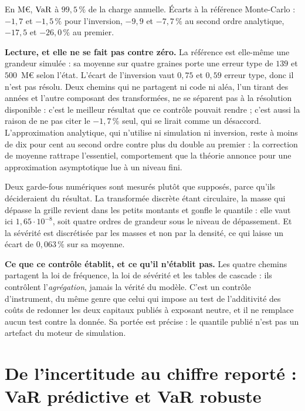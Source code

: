\vspace{4pt}
\noindent En M\euro, $\mathrm{VaR}$ à $99{,}5\,\%$ de la charge annuelle. Écarts à la référence
Monte-Carlo : $-1{,}7$ et $-1{,}5\,\%$ pour l'inversion, $-9{,}9$ et $-7{,}7\,\%$ au second ordre
analytique, $-17{,}5$ et $-26{,}0\,\%$ au premier.

\textbf{Lecture, et elle ne se fait pas contre zéro.} La référence est elle-même une grandeur
simulée : sa moyenne sur quatre graines porte une erreur type de $139$ et $500$~M\euro{} selon
l'état. L'écart de l'inversion vaut $0{,}75$ et $0{,}59$ erreur type, donc il n'est pas
résolu. Deux chemins qui ne partagent ni code ni aléa, l'un tirant des années et l'autre
composant des transformées, ne se séparent pas à la résolution disponible : c'est le meilleur
résultat que ce contrôle pouvait rendre ; c'est aussi la raison de ne pas citer le $-1{,}7\,\%$
seul, qui se lirait comme un désaccord. L'approximation analytique, qui n'utilise ni simulation
ni inversion, reste à moins de dix pour cent au second ordre contre plus du double au premier :
la correction de moyenne rattrape l'essentiel, comportement que la théorie annonce pour une
approximation asymptotique lue à un niveau fini.

Deux garde-fous numériques sont mesurés plutôt que supposés, parce qu'ils décideraient du
résultat. La transformée discrète étant circulaire, la masse qui dépasse la grille revient dans
les petits montants et gonfle le quantile : elle vaut ici $1{,}65\cdot 10^{-8}$, soit quatre ordres
de grandeur sous le niveau de dépassement. Et la sévérité est discrétisée par les masses et non
par la densité, ce qui laisse un écart de $0{,}063\,\%$ sur sa moyenne.

\begin{cle}
\textbf{Ce que ce contrôle établit, et ce qu'il n'établit pas.} Les quatre chemins partagent la
loi de fréquence, la loi de sévérité et les tables de cascade : ils contrôlent
l'\emph{agrégation}, jamais la vérité du modèle. C'est un contrôle d'instrument, du même genre
que celui qui impose au test de l'additivité des coûts de redonner les deux capitaux publiés à
exposant neutre, et il ne remplace aucun test contre la donnée. Sa portée est précise : le
quantile publié n'est pas un artefact du moteur de simulation.
\end{cle}


\section{De l'incertitude au chiffre reporté : VaR prédictive et VaR robuste}
\label{sec:predictive-robuste}

